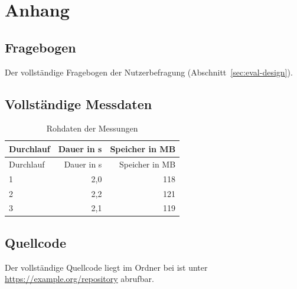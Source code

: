\chapter{Anhang}
\label{cha:anhang}


\section{Fragebogen}
\label{sec:anhang-fragebogen}
Der vollständige Fragebogen der Nutzerbefragung (\vgl Abschnitt~\ref{sec:eval-design}).

% 

\section{Vollständige Messdaten}
\label{sec:anhang-messdaten}

\begin{longtable}{lrr}
  \caption{Rohdaten der Messungen}\label{tab:rohdaten} \\
  \toprule
  Durchlauf & Dauer in s & Speicher in MB \\
  \midrule
  \endfirsthead
  \toprule
  Durchlauf & Dauer in s & Speicher in MB \\
  \midrule
  \endhead
  1 & 2{,}0 & 118 \\
  2 & 2{,}2 & 121 \\
  3 & 2{,}1 & 119 \\
  \bottomrule
\end{longtable}

\section{Quellcode}
\label{sec:anhang-code}
Der vollständige Quellcode liegt im Ordner  bei \bzw ist unter
\url{https://example.org/repository} abrufbar.
